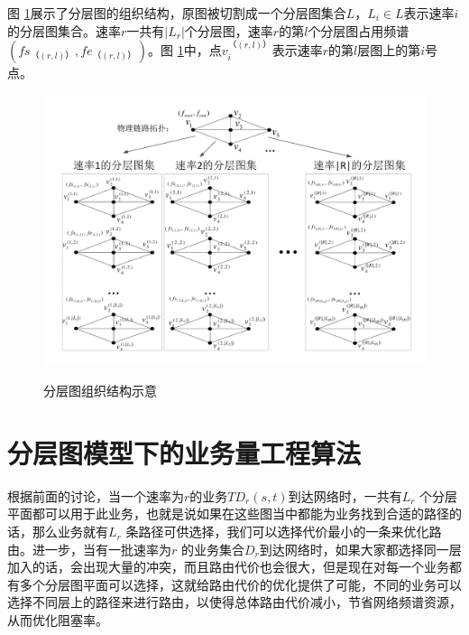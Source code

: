 图 \ref{layer}展示了分层图的组织结构，原图被切割成一个分层图集合$L$，$L_i \in L$表示速率$i$的分层图集合。速率$r$一共有$|L_r|$个分层图，速率$r$的第$l$个分层图占用频谱$(fs_{（ (r,l) ）},fe_{（ (r,l) ）})$。图 \ref{layer}中，点$v_i^{（ (r,l) ）}$表示速率$r$的第$l$层图上的第$i$号点。
\begin{figure}
\setlength{\abovecaptionskip}{-0.5cm}
\begin{center}
{\includegraphics[width=1 \textwidth]{figures/LAYER.pdf}}
\end{center}
\caption{{\footnotesize{分层图组织结构示意}}}
\label{layer}
\end{figure}
\section{分层图模型下的业务量工程算法}
根据前面的讨论，当一个速率为$r$的业务$TD_r(s,t)$到达网络时，一共有$L_r$ 个分层平面都可以用于此业务，也就是说如果在这些图当中都能为业务找到合适的路径的话，那么业务就有$L_r$ 条路径可供选择，我们可以选择代价最小的一条来优化路由。进一步，当有一批速率为$r$ 的业务集合$D_r$到达网络时，如果大家都选择同一层加入的话，会出现大量的冲突，而且路由代价也会很大，但是现在对每一个业务都有多个分层图平面可以选择，这就给路由代价的优化提供了可能，不同的业务可以选择不同层上的路径来进行路由，以使得总体路由代价减小，节省网络频谱资源，从而优化阻塞率。

